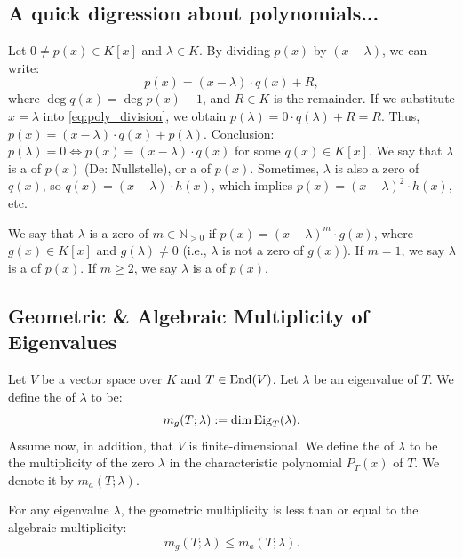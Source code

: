 \subsection{A quick digression about polynomials...}
Let $0 \ne p(x) \in K[x]$ and $\lambda \in K$. By dividing $p(x)$ by $(x-\lambda)$, we can write:
\begin{equation} \label{eq:poly_division}
  p(x) = (x-\lambda) \cdot q(x) + R,
\end{equation}
where $\deg q(x) = \deg p(x) - 1$, and $R \in K$ is the remainder.
If we substitute $x = \lambda$ into \eqref{eq:poly_division}, we obtain $p(\lambda) = 0 \cdot q(\lambda) + R = R$. Thus, $p(x) = (x-\lambda) \cdot q(x) + p(\lambda)$.
Conclusion: $p(\lambda) = 0 \iff p(x) = (x-\lambda) \cdot q(x)$ for some $q(x) \in K[x]$.
We say that $\lambda$ is a  of $p(x)$ (De: Nullstelle), or a  of $p(x)$.
Sometimes, $\lambda$ is also a zero of $q(x)$, so $q(x) = (x-\lambda) \cdot h(x)$, which implies $p(x) = (x-\lambda)^2 \cdot h(x)$, etc.

\begin{definition} \label{def:mult_zero}
  We say that $\lambda$ is a zero of  $m \in \mathbb{N}_{>0}$ if $p(x) = (x-\lambda)^m \cdot g(x)$, where $g(x) \in K[x]$ and $g(\lambda) \ne 0$ (i.e., $\lambda$ is not a zero of $g(x)$).
  If $m=1$, we say $\lambda$ is a  of $p(x)$.
  If $m \ge 2$, we say $\lambda$ is a  of $p(x)$.
\end{definition}

\subsection{Geometric \& Algebraic Multiplicity of Eigenvalues}

\begin{definition} \label{def:geom_alg_mult}
  Let $V$ be a vector space over $K$ and $T \in \operatorname{End}(V)$. Let $\lambda$ be an eigenvalue of $T$. We define the  of $\lambda$ to be:
  \[ m_g(T;\lambda) := \dim \operatorname{Eig}_T(\lambda). \]
  Assume now, in addition, that $V$ is finite-di\-men\-sional. We define the  of $\lambda$ to be the multiplicity of the zero $\lambda$ in the characteristic polynomial $P_T(x)$ of $T$. We denote it by $m_a(T;\lambda)$.
\end{definition}

\begin{proposition} \label{prop:mult_inequality}
  For any eigenvalue $\lambda$, the geometric multiplicity is less than or equal to the algebraic multiplicity:
  \[ m_g(T; \lambda) \le m_a(T; \lambda). \]
\end{proposition}

